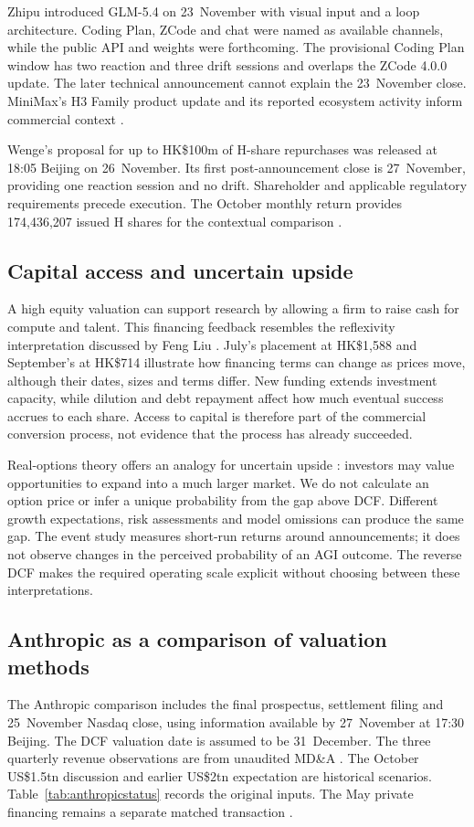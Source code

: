 \documentclass[11pt]{article}
\begin{document}
Zhipu introduced GLM-5.4 on 23~November with visual input and a loop architecture. Coding Plan, ZCode and chat were named as available channels, while the public API and weights were forthcoming. The provisional Coding Plan window has two reaction and three drift sessions and overlaps the ZCode 4.0.0 update. The later technical announcement cannot explain the 23~November close. MiniMax's H3 Family product update and its reported ecosystem activity inform commercial context \citep{novembermodels2026}.

Wenge's proposal for up to HK\$100m of H-share repurchases was released at 18:05 Beijing on 26~November. Its first post-announcement close is 27~November, providing one reaction session and no drift. Shareholder and applicable regulatory requirements precede execution. The October monthly return provides 174,436,207 issued H shares for the contextual comparison \citep{wengebuyback2026}.

\subsection{Capital access and uncertain upside}
A high equity valuation can support research by allowing a firm to raise cash for compute and talent. This financing feedback resembles the reflexivity interpretation discussed by Feng Liu \citep{fengliu}. July's placement at HK\$1,588 and September's at HK\$714 illustrate how financing terms can change as prices move, although their dates, sizes and terms differ. New funding extends investment capacity, while dilution and debt repayment affect how much eventual success accrues to each share. Access to capital is therefore part of the commercial conversion process, not evidence that the process has already succeeded.

Real-options theory offers an analogy for uncertain upside \citep{black1973,damodaran2018}: investors may value opportunities to expand into a much larger market. We do not calculate an option price or infer a unique probability from the gap above DCF. Different growth expectations, risk assessments and model omissions can produce the same gap. The event study measures short-run returns around announcements; it does not observe changes in the perceived probability of an AGI outcome. The reverse DCF makes the required operating scale explicit without choosing between these interpretations.

\subsection{Anthropic as a comparison of valuation methods}
The Anthropic comparison includes the final prospectus, settlement filing and 25~November Nasdaq close, using information available by 27~November at 17:30 Beijing. The DCF valuation date is assumed to be 31~December. The three quarterly revenue observations are from unaudited MD\&A \citep{anthropics1amend2026}. The October US\$1.5tn discussion and earlier US\$2tn expectation are historical scenarios. Table~\ref{tab:anthropicstatus} records the original inputs. The May private financing remains a separate matched transaction \citep{anthropic2026}.
\end{document}
